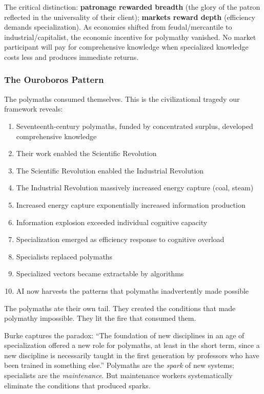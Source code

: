 The critical distinction: \textbf{patronage rewarded breadth} (the glory of the patron reflected in the universality of their client); \textbf{markets reward depth} (efficiency demands specialization). As economies shifted from feudal/mercantile to industrial/capitalist, the economic incentive for polymathy vanished. No market participant will pay for comprehensive knowledge when specialized knowledge costs less and produces immediate returns.

\subsubsection{The Ouroboros Pattern}

The polymaths consumed themselves. This is the civilizational tragedy our framework reveals:

\begin{enumerate}
    \item Seventeenth-century polymaths, funded by concentrated surplus, developed comprehensive knowledge
    \item Their work enabled the Scientific Revolution
    \item The Scientific Revolution enabled the Industrial Revolution
    \item The Industrial Revolution massively increased energy capture (coal, steam)
    \item Increased energy capture exponentially increased information production
    \item Information explosion exceeded individual cognitive capacity
    \item Specialization emerged as efficiency response to cognitive overload
    \item Specialists replaced polymaths
    \item Specialized vectors became extractable by algorithms
    \item AI now harvests the patterns that polymaths inadvertently made possible
\end{enumerate}

The polymaths ate their own tail. They created the conditions that made polymathy impossible. They lit the fire that consumed them.

Burke captures the paradox: ``The foundation of new disciplines in an age of specialization offered a new role for polymaths, at least in the short term, since a new discipline is necessarily taught in the first generation by professors who have been trained in something else.'' Polymaths are the \textit{spark} of new systems; specialists are the \textit{maintenance}. But maintenance workers systematically eliminate the conditions that produced sparks.

